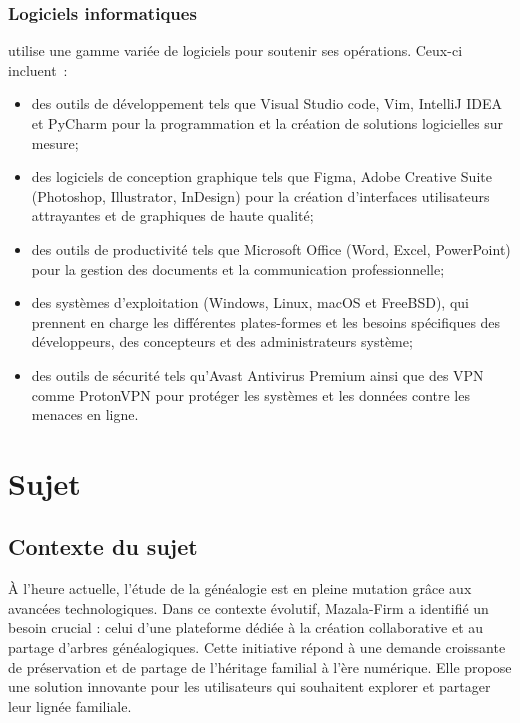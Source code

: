\subsubsection   { Logiciels informatiques }
\firm utilise une gamme variée de logiciels pour soutenir ses opérations. Ceux-ci incluent :
\begin{itemize}

  \item des outils de développement tels que Visual Studio code, Vim, IntelliJ IDEA et
    PyCharm pour la programmation et la création de solutions logicielles sur mesure;

  \item des logiciels de conception graphique tels que Figma, Adobe Creative Suite
    (Photoshop, Illustrator, InDesign) pour la création d’interfaces utilisateurs
    attrayantes et de graphiques de haute qualité;

  \item des outils de productivité tels que Microsoft Office (Word, Excel, PowerPoint)
    pour la gestion des documents et la communication professionnelle;

  \item des systèmes d’exploitation  (Windows, Linux, macOS et FreeBSD), qui prennent en charge
    les différentes plates-formes et les besoins spécifiques des développeurs,
    des concepteurs et des administrateurs système;

  \item des outils de sécurité tels qu’Avast Antivirus Premium ainsi que des VPN comme ProtonVPN
    pour protéger les systèmes et les données contre les menaces en ligne.

\end{itemize}

\newpage


\section{Sujet}
\subsection{Contexte du sujet}

À l'heure actuelle, l'étude de la généalogie est en pleine mutation grâce aux
avancées technologiques. Dans ce contexte évolutif, Mazala-Firm a identifié un
besoin crucial : celui d'une plateforme dédiée à la création collaborative et au
partage d'arbres généalogiques. Cette initiative répond à une demande croissante de
préservation et de partage de l’héritage familial à l’ère numérique. Elle
propose une solution innovante pour les utilisateurs qui souhaitent explorer et
partager leur lignée familiale.


